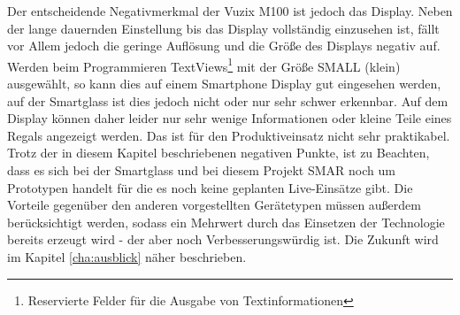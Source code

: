 Der entscheidende Negativmerkmal der Vuzix M100 ist jedoch das Display. Neben der lange dauernden Einstellung bis das Display vollständig einzusehen ist, fällt vor Allem jedoch die geringe Auflösung und die Größe des Displays negativ auf. Werden beim Programmieren TextViews\footnote{Reservierte Felder für die Ausgabe von Textinformationen} mit der Größe SMALL (klein) ausgewählt, so kann dies auf einem Smartphone Display gut eingesehen werden, auf der Smartglass ist dies jedoch nicht oder nur sehr schwer erkennbar. Auf dem Display können daher leider nur sehr wenige Informationen oder kleine Teile eines Regals angezeigt werden. Das ist für den Produktiveinsatz nicht sehr praktikabel.\\

Trotz der in diesem Kapitel beschriebenen negativen Punkte, ist zu Beachten, dass es sich bei der Smartglass und bei diesem Projekt \ac{SMAR} noch um Prototypen handelt für die es noch keine geplanten Live-Einsätze gibt. Die Vorteile gegenüber den anderen vorgestellten Gerätetypen müssen außerdem berücksichtigt werden, sodass ein Mehrwert durch das Einsetzen der Technologie bereits erzeugt wird - der aber noch Verbesserungswürdig ist.
Die Zukunft wird im Kapitel \ref{cha:ausblick}  näher beschrieben.